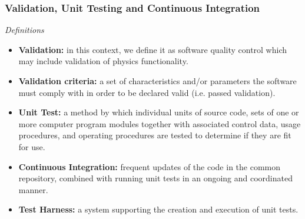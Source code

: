 \subsubsection{Validation, Unit Testing and Continuous Integration }
\textit{Definitions}

\begin{itemize}
\item \textbf{Validation:} in this context, we define it as software quality control which may include validation of physics functionality.

\item  \textbf{Validation criteria:} a set of characteristics and/or parameters the software must comply with in order to be declared valid (i.e. passed validation).

\item \textbf{Unit Test:} a method by which individual units of source code, sets of one or more computer program modules together with associated control data, usage procedures, and operating procedures are tested to determine if they are fit for use.

\item \textbf{Continuous Integration:} frequent updates of the code in the common repository, combined with running unit tests in an ongoing and coordinated manner.

\item \textbf{Test Harness:} a system supporting the creation and execution of unit tests.


\end{itemize}

